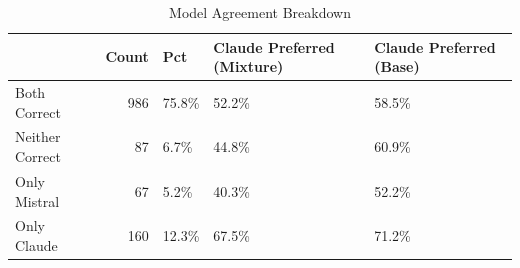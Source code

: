 \begin{table}[h]
\caption{Model Agreement Breakdown}
\label{tab:model_agreement}
\begin{tabular}{lrlll}
\toprule
 & Count & Pct & Claude Preferred (Mixture) & Claude Preferred (Base) \\
\midrule
Both Correct & 986 & 75.8\% & 52.2\% & 58.5\% \\
Neither Correct & 87 & 6.7\% & 44.8\% & 60.9\% \\
Only Mistral & 67 & 5.2\% & 40.3\% & 52.2\% \\
Only Claude & 160 & 12.3\% & 67.5\% & 71.2\% \\
\bottomrule
\end{tabular}
\end{table}
